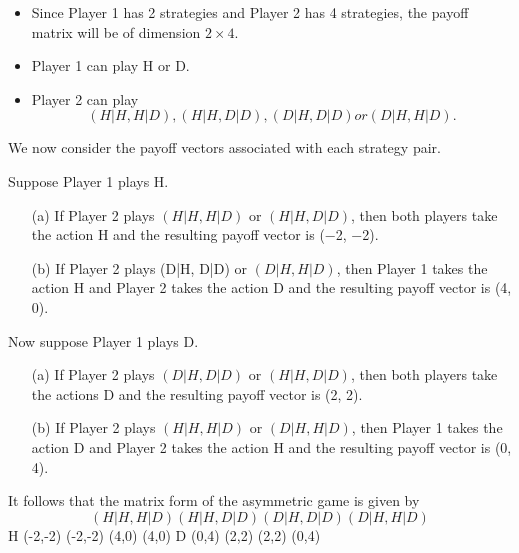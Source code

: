 \documentclass[]{report}
\begin{document}
\begin{itemize}
	\item Since Player 1 has 2 strategies and Player 2 has 4 strategies, the
	payoff matrix will be of dimension $2 \times 4$.
	\item Player 1 can play H or D.
	\item 	Player 2 can play \[(H|H, H|D), (H|H, D|D), (D|H, D|D) or
	(D|H, H|D). \]
\end{itemize}

We now consider the payoff vectors associated with each strategy
pair.
\begin{framed}
\noindent Suppose Player 1 plays H.
\begin{itemize}
	\item[(a)] If Player 2 plays $(H|H, H|D)$ or $(H|H, D|D)$, then both players
take the action H and the resulting payoff vector is (−2, −2).
	\item[(b)] If Player 2 plays (D|H, D|D) or $(D|H, H|D)$, then Player 1
takes the action H and Player 2 takes the action D and the
resulting payoff vector is (4, 0).
\end{itemize}
\end{framed}

Now suppose Player 1 plays D.
\begin{itemize}
	\item[(a)] If Player 2 plays $(D|H, D|D)$ or $(H|H, D|D)$, then both players
	take the actions D and the resulting payoff vector is (2, 2).
	\item[(b)] If Player 2 plays $(H|H, H|D)$ or $(D|H, H|D)$, then Player 1 takes
	the action D and Player 2 takes the action H and the resulting
	payoff vector is (0, 4).
\end{itemize}

It follows that the matrix form of the asymmetric game is given by
\[(H|H, H|D) (H|H, D|D) (D|H, D|D) (D|H, H|D)\]
H (-2,-2) (-2,-2) (4,0) (4,0)
D (0,4) (2,2) (2,2) (0,4)
\end{document}

